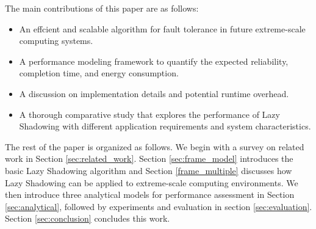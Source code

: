 The main contributions of this paper are as follows:
\begin{itemize}
	\item An effcient and scalable algorithm for fault tolerance in future extreme-scale computing systems.
    \item A performance modeling framework to quantify the expected reliability, completion time, and energy consumption.
    \item A discussion on implementation details and potential runtime overhead.
	\item A thorough comparative study that explores the performance of Lazy Shadowing with different application requirements and system characteristics.
\end{itemize}


The rest of the paper is organized as follows. We begin with a survey on related work in Section 
\ref{sec:related_work}. Section \ref{sec:frame_model} introduces the basic Lazy Shadowing algorithm and Section \ref{frame_multiple} discusses how Lazy Shadowing can be applied to 
extreme-scale computing environments. 
We then introduce three analytical models for performance assessment
in Section \ref{sec:analytical}, 
followed by experiments and evaluation in
section \ref{sec:evaluation}. Section \ref{sec:conclusion} concludes this work.%
